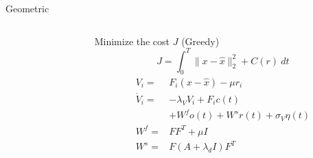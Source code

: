 \documentclass[17pt, t, lualatex]{beamer}
\begin{document}
\begin{frame}{Geometric}
{\begin{columns}[T]
\begin{column}{0.2\textwidth}
		\end{column}
		\begin{column}{0.6\textwidth}
			Minimize the cost $J$ (Greedy)\\
			\begin{equation}
				J = \int_{0}^{T} \|x-\hat{x}\|^2_2 + C(r) \ dt
			\end{equation}
			\begin{equation}
			\begin{aligned}
				V_i=&F_i(x-\hat{x}) - \mu r_i\\
				\dot{V}_i=&-\lambda_V V_i+F_ic(t)\\
				&+ W^fo(t) + W^sr(t)+\sigma_V \eta(t)\\
				W^f =& FF^T+ \mu I\\
				W^s =& F\left(A + \lambda_dI\right)F^T
			\end{aligned}
			\end{equation}
		\end{column}
	\end{columns}
	}

\end{frame}


\end{document}
